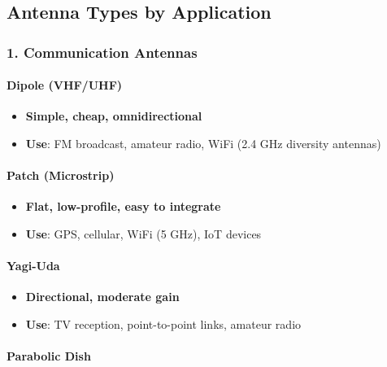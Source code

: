 \subsection{Antenna Types by
Application}\label{antenna-types-by-application}

\subsubsection{1. Communication Antennas}\label{communication-antennas}

\paragraph{Dipole (VHF/UHF)}\label{dipole-vhfuhf}

\begin{itemize}
\tightlist
\item
  \textbf{Simple, cheap, omnidirectional}
\item
  \textbf{Use}: FM broadcast, amateur radio, WiFi (2.4 GHz diversity
  antennas)
\end{itemize}

\paragraph{Patch (Microstrip)}\label{patch-microstrip}

\begin{itemize}
\tightlist
\item
  \textbf{Flat, low-profile, easy to integrate}
\item
  \textbf{Use}: GPS, cellular, WiFi (5 GHz), IoT devices
\end{itemize}

\paragraph{Yagi-Uda}\label{yagi-uda}

\begin{itemize}
\tightlist
\item
  \textbf{Directional, moderate gain}
\item
  \textbf{Use}: TV reception, point-to-point links, amateur radio
\end{itemize}

\paragraph{Parabolic Dish}\label{parabolic-dish}

